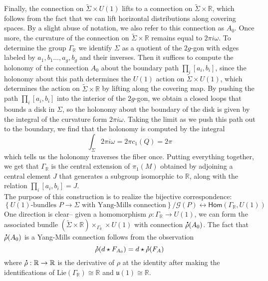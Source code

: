 \documentclass[psamsfonts, 12pt]{amsart}
\theoremstyle{definition}
\theoremstyle{remark}
\renewcommand{\hom}{\mathsf{Hom}}
\newcommand{\R}{\mathbb{R}}
\newcommand*{\dt}[1]{%
   \accentset{\mbox{\large\bfseries .}}{#1}}
\newcommand{\set}[1]{\left\lbrace #1 \right\rbrace}
\begin{document}
Finally, the connection on $\widetilde{\Sigma} \times U(1)$ lifts to a connection
on $\widetilde{\Sigma} \times \R$, which follows from the fact that we can lift
horizontal distributions along covering spaces. By a slight abuse of notation, we
also refer to this connection as $A_0$. Once more, the curvature of the
connection on $\widetilde{\Sigma} \times \R$ remains equal to $2\pi i \omega$.
To determine the group $\Gamma_\R$ we identify $\Sigma$ as a quotient of the
$2g$-gon with edges labeled by $a_1,b_1 \ldots, a_g,b_g$ and their inverses. Then
it suffices to compute the holonomy of the connection $A_0$ about
the boundary path $\prod_i [a_i,b_i]$, since the holonomy about this path
determines the $U(1)$ action on $\widetilde{\Sigma} \times U(1)$, which determines the
action on $\widetilde{\Sigma} \times \R$ by lifting along the covering map. By pushing
the path $\prod_i [a_i,b_i]$ into the interior of the $2g$-gon, we obtain a closed
loops that bounds a disk in $\Sigma$, so the holonomy about the boundary of the disk
is given by the integral of the curvature form $2\pi i \omega$. Taking the limit
as we push this path out to the boundary, we find that the holonomy is computed by
the integral
\[
\int_\Sigma 2\pi i\omega = 2\pi c_1(Q) = 2\pi
\]
which tells us the holonomy traverses the fiber once. Putting everything together,
we get that $\Gamma_\R$ is the central extension of $\pi_1(M)$ obtained by adjoining
a central element $J$ that generates a subgroup isomorphic to $\R$, along with the
relation $\prod_i [a_i,b_i] = J$. \\

The purpose of this construction is to realize the bijective correspondence:
\[
\set{U(1)\text{-bundles }P \to \Sigma\text{ with Yang-Mills connection}}/\mathscr{G}(P)
\longleftrightarrow \hom(\Gamma_\R, U(1))
\]
One direction is clear-- given a homomorphism $\rho : \Gamma_\R \to U(1)$, we can form
the associated bundle $(\widetilde{\Sigma} \times \R) \times_{\Gamma_\R} \times U(1)$
with connection $\dt{\rho}(A_0)$. The fact that $\dt{\rho}(A_0)$ is a
Yang-Mills connection follows from the observation
\[
\dt{\rho}(d\star F_{A_0}) = d\star\dt{\rho}(F_A)
\]
where $\dt{\rho} : \R \to \R$ is the derivative of $\rho$ at the identity after making
the identifications of
$\mathrm{Lie}(\Gamma_\R) \cong \R$ and $\mathfrak{u}(1) \cong \R$. \\
\end{document}

